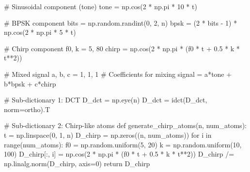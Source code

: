 \documentclass[
  letterpaper,
  DIV=11,
  numbers=noendperiod]{scrartcl}
\newenvironment{Shaded}{\begin{snugshade}}{\end{snugshade}}
\newcommand{\BuiltInTok}[1]{\textcolor[rgb]{0.40,0.85,0.94}{#1}}
\newcommand{\CommentTok}[1]{\textcolor[rgb]{0.46,0.44,0.37}{#1}}
\newcommand{\ControlFlowTok}[1]{\textcolor[rgb]{0.98,0.15,0.45}{#1}}
\newcommand{\DecValTok}[1]{\textcolor[rgb]{0.68,0.51,1.00}{#1}}
\newcommand{\FloatTok}[1]{\textcolor[rgb]{0.68,0.51,1.00}{#1}}
\newcommand{\KeywordTok}[1]{\textcolor[rgb]{0.98,0.15,0.45}{#1}}
\newcommand{\NormalTok}[1]{\textcolor[rgb]{0.97,0.97,0.95}{#1}}
\newcommand{\OperatorTok}[1]{\textcolor[rgb]{0.97,0.97,0.95}{#1}}
\newcommand{\StringTok}[1]{\textcolor[rgb]{0.90,0.86,0.45}{#1}}
\begin{document}
\begin{Shaded}
\begin{Highlighting}[]
\CommentTok{\# Sinusoidal component (tone)}
\NormalTok{tone }\OperatorTok{=}\NormalTok{ np.cos(}\DecValTok{2} \OperatorTok{*}\NormalTok{ np.pi }\OperatorTok{*} \DecValTok{10} \OperatorTok{*}\NormalTok{ t)}

\CommentTok{\# BPSK component}
\NormalTok{bits }\OperatorTok{=}\NormalTok{ np.random.randint(}\DecValTok{0}\NormalTok{, }\DecValTok{2}\NormalTok{, n)}
\NormalTok{bpsk }\OperatorTok{=}\NormalTok{ (}\DecValTok{2} \OperatorTok{*}\NormalTok{ bits }\OperatorTok{{-}} \DecValTok{1}\NormalTok{) }\OperatorTok{*}\NormalTok{ np.cos(}\DecValTok{2} \OperatorTok{*}\NormalTok{ np.pi }\OperatorTok{*} \DecValTok{5} \OperatorTok{*}\NormalTok{ t)}

\CommentTok{\# Chirp component}
\NormalTok{f0, k }\OperatorTok{=} \DecValTok{5}\NormalTok{, }\DecValTok{80}
\NormalTok{chirp }\OperatorTok{=}\NormalTok{ np.cos(}\DecValTok{2} \OperatorTok{*}\NormalTok{ np.pi }\OperatorTok{*}\NormalTok{ (f0 }\OperatorTok{*}\NormalTok{ t }\OperatorTok{+} \FloatTok{0.5} \OperatorTok{*}\NormalTok{ k }\OperatorTok{*}\NormalTok{ t}\OperatorTok{**}\DecValTok{2}\NormalTok{))}

\CommentTok{\# Mixed signal }
\NormalTok{a, b, c }\OperatorTok{=} \DecValTok{1}\NormalTok{, }\DecValTok{1}\NormalTok{, }\DecValTok{1}  \CommentTok{\# Coefficients for mixing}
\NormalTok{signal }\OperatorTok{=}\NormalTok{ a}\OperatorTok{*}\NormalTok{tone }\OperatorTok{+}\NormalTok{ b}\OperatorTok{*}\NormalTok{bpsk }\OperatorTok{+}\NormalTok{ c}\OperatorTok{*}\NormalTok{chirp}

\CommentTok{\# Sub{-}dictionary 1: DCT}
\NormalTok{D\_dct }\OperatorTok{=}\NormalTok{ np.eye(n)}
\NormalTok{D\_dct }\OperatorTok{=}\NormalTok{ idct(D\_dct, norm}\OperatorTok{=}\StringTok{\textquotesingle{}ortho\textquotesingle{}}\NormalTok{).T}

\CommentTok{\# Sub{-}dictionary 2: Chirp{-}like atoms}
\KeywordTok{def}\NormalTok{ generate\_chirp\_atoms(n, num\_atoms):}
\NormalTok{    t }\OperatorTok{=}\NormalTok{ np.linspace(}\DecValTok{0}\NormalTok{, }\DecValTok{1}\NormalTok{, n)}
\NormalTok{    D\_chirp }\OperatorTok{=}\NormalTok{ np.zeros((n, num\_atoms))}
    \ControlFlowTok{for}\NormalTok{ i }\KeywordTok{in} \BuiltInTok{range}\NormalTok{(num\_atoms):}
\NormalTok{        f0 }\OperatorTok{=}\NormalTok{ np.random.uniform(}\DecValTok{5}\NormalTok{, }\DecValTok{20}\NormalTok{)}
\NormalTok{        k }\OperatorTok{=}\NormalTok{ np.random.uniform(}\DecValTok{10}\NormalTok{, }\DecValTok{100}\NormalTok{)}
\NormalTok{        D\_chirp[:, i] }\OperatorTok{=}\NormalTok{ np.cos(}\DecValTok{2} \OperatorTok{*}\NormalTok{ np.pi }\OperatorTok{*}\NormalTok{ (f0 }\OperatorTok{*}\NormalTok{ t }\OperatorTok{+} \FloatTok{0.5} \OperatorTok{*}\NormalTok{ k }\OperatorTok{*}\NormalTok{ t}\OperatorTok{**}\DecValTok{2}\NormalTok{))}
\NormalTok{    D\_chirp }\OperatorTok{/=}\NormalTok{ np.linalg.norm(D\_chirp, axis}\OperatorTok{=}\DecValTok{0}\NormalTok{)}
    \ControlFlowTok{return}\NormalTok{ D\_chirp}


\end{Highlighting}
\end{Shaded}
\end{document}
